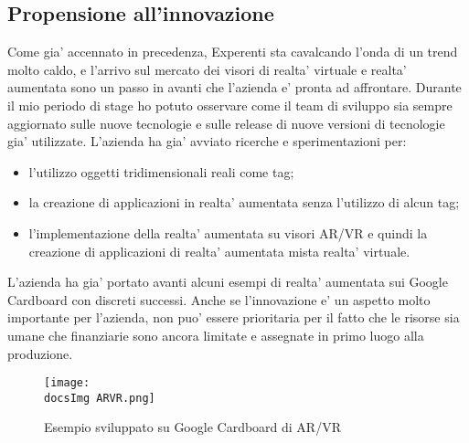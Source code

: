 \subsection{Propensione all'innovazione}
Come gia' accennato in precedenza, Experenti sta cavalcando l'onda di un trend molto caldo, e l'arrivo sul mercato dei visori di realta' virtuale e realta' aumentata sono un passo in avanti che l'azienda e' pronta ad affrontare. Durante il mio periodo di stage ho potuto osservare come il team di sviluppo sia sempre aggiornato sulle nuove tecnologie e sulle release di nuove versioni di tecnologie gia' utilizzate.
L'azienda ha gia' avviato ricerche e sperimentazioni per:
\begin{itemize}
	\item l'utilizzo oggetti tridimensionali reali come tag;
	\item la creazione di applicazioni in realta' aumentata senza l'utilizzo di alcun tag;
	\item l'implementazione della realta' aumentata su visori AR/VR e quindi la creazione di applicazioni di realta' aumentata mista realta' virtuale.
\end{itemize}
L'azienda ha gia' portato avanti alcuni esempi di realta' aumentata sui Google Cardboard con discreti successi.
Anche se l'innovazione e' un aspetto molto importante per l'azienda, non puo' essere prioritaria per il fatto che le risorse sia umane che finanziarie sono ancora limitate e assegnate in primo luogo alla produzione.

\begin{figure}[H]
	\centering
	\texttt{[image: \\docsImg ARVR.png]}
	\caption{Esempio sviluppato su Google Cardboard di AR/VR}
	\label{fig:Esempio sviluppato su Google Cardboard di AR/VR}
\end{figure}